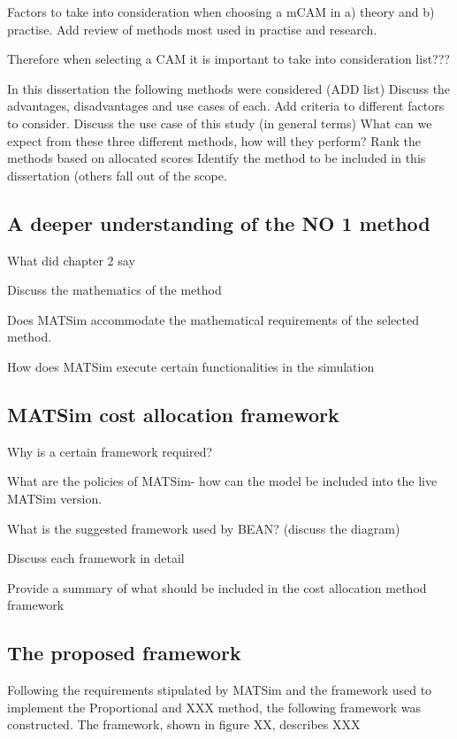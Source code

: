 Factors to take into consideration when choosing a mCAM in a) theory and b) practise. Add review of methods most used in practise and research.

Therefore when selecting a CAM it is important to take into consideration list???

In this dissertation the following methods were considered (ADD list)
Discuss the advantages, disadvantages and use cases of each.
Add criteria to different factors to consider.
Discuss the use case of this study (in general terms)
What can we expect from these three different methods, how will they perform?
Rank the methods based on allocated scores
Identify the method to be included in this dissertation (others fall out of the scope.

\subsection{A deeper understanding of the NO 1 method}
What did chapter 2 say

Discuss the mathematics of the method

Does MATSim accommodate the mathematical requirements of the selected method.

How does MATSim execute certain functionalities in the simulation

\subsection{MATSim cost allocation framework}

Why is a certain framework required?

What are the policies of MATSim- how can the model be included into the live MATSim version.

What is the suggested framework used by BEAN? (discuss the diagram)

Discuss each framework in detail 

Provide a summary of what should be included in the cost allocation method framework
\subsection{The proposed framework}
Following the requirements stipulated by MATSim and the framework used to implement the Proportional and XXX method, the following framework was constructed. The framework, shown in figure XX, describes XXX

